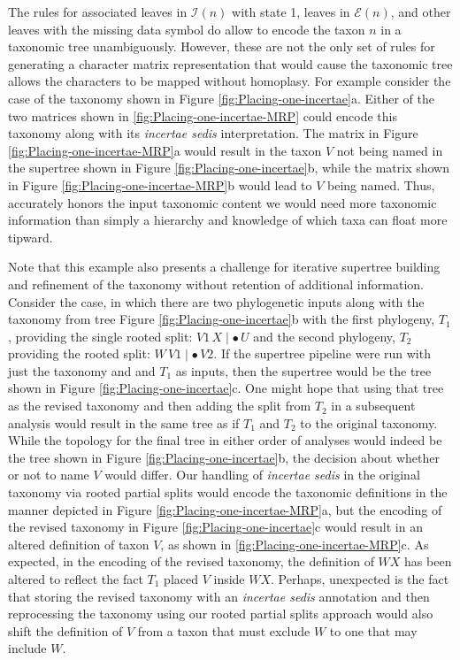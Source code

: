 \documentclass[english]{article}
\begin{document}
The rules for associated leaves in $\mathcal{I}(n)$ with state 1, leaves
     in $\mathcal{E}(n)$, and other leaves with the missing data symbol 
     do allow to encode the taxon $n$ in a taxonomic tree unambiguously.
However, these are not the only set of rules for generating a character matrix
    representation that would cause the taxonomic tree allows the characters to
    be mapped without homoplasy.
For example consider the case of the taxonomy shown in Figure \ref{fig:Placing-one-incertae}a.
Either of the two matrices shown in \ref{fig:Placing-one-incertae-MRP} could encode this
    taxonomy along with its \emph{incertae sedis} interpretation.
The matrix in Figure \ref{fig:Placing-one-incertae-MRP}a would result in the 
    taxon $V$ not being named in the supertree shown in Figure \ref{fig:Placing-one-incertae}b,
    while the matrix shown in Figure \ref{fig:Placing-one-incertae-MRP}b would lead
    to $V$ being named.
Thus, accurately
    honors the input taxonomic content we would need more taxonomic information
    than simply a hierarchy and knowledge of which taxa can float more tipward.

Note that this example also presents a challenge for iterative supertree building and refinement
    of the taxonomy without retention of additional information.
Consider the case, in which there are two phylogenetic inputs along with the taxonomy from
    tree Figure \ref{fig:Placing-one-incertae}b with the first phylogeny, $T_1$, providing the single
    rooted split: $V1\,X \mid \bullet\,U$ and the second phylogeny, $T_2$ providing the 
    rooted split: $W\, V1 \mid \bullet\,V2$.
If the supertree pipeline were run with just the taxonomy and and $T_1$ as inputs, then the supertree
    would be the tree shown in Figure \ref{fig:Placing-one-incertae}c.
One might hope that using that tree as the revised taxonomy and then adding the split from $T_2$ in
    a subsequent analysis would result in the same tree as if $T_1$ and $T_2$ to the original taxonomy.
While the topology for the final tree in either order of analyses would indeed be the tree shown in 
    Figure \ref{fig:Placing-one-incertae}b, the decision about whether or not to name $V$ would differ.
Our handling of \emph{incertae sedis} in the original taxonomy via rooted partial splits
    would encode the taxonomic definitions in the manner depicted in Figure \ref{fig:Placing-one-incertae-MRP}a,
    but the encoding of the revised taxonomy in Figure \ref{fig:Placing-one-incertae}c would result
    in an altered definition of taxon $V$, as shown in \ref{fig:Placing-one-incertae-MRP}c.
As expected, in the encoding of the revised taxonomy, the definition of $WX$ has been altered to reflect the
    fact $T_1$ placed $V$ inside $WX$.
Perhaps, unexpected is the fact that storing the revised taxonomy with an \emph{incertae sedis} annotation
    and then reprocessing the taxonomy using our rooted partial splits approach would also shift
    the definition of $V$ from a taxon that must exclude $W$ to one that may include $W$.
\end{document}
